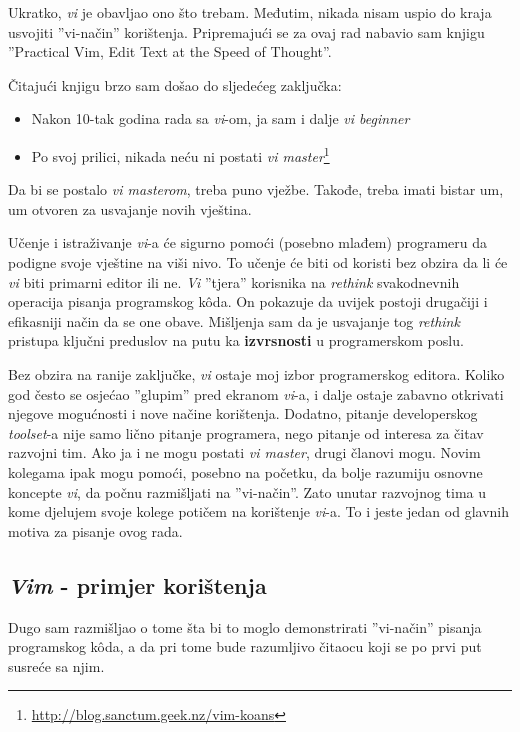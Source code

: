 \documentclass[times, utf8, seminar]{fit}
\begin{document}
Ukratko, \emph{vi} je obavljao ono što trebam. Međutim, nikada nisam uspio do kraja usvojiti ''vi-način'' korištenja. Pripremajući se za ovaj rad nabavio sam knjigu ''Practical Vim, Edit Text at the Speed of Thought''\citep{pragvim}.

Čitajući knjigu brzo sam došao do sljedećeg zaključka:
\begin{itemize}
  \item Nakon 10-tak godina rada sa \emph{vi}-om, ja sam i dalje \emph{vi beginner} 
  \item Po svoj prilici, nikada neću ni postati \emph{vi master}\footnote{\url{http://blog.sanctum.geek.nz/vim-koans}}
\end{itemize}

Da bi se postalo \emph{vi masterom}, treba puno vježbe. Takođe, treba imati bistar um, um otvoren za usvajanje novih vještina. 

Učenje i istraživanje \emph{vi}-a će sigurno pomoći (posebno mlađem) programeru da podigne svoje vještine na viši nivo. To učenje će biti od koristi bez obzira da li će \emph{vi} biti primarni editor ili ne. \emph{Vi} ''tjera'' korisnika na \emph{rethink} svakodnevnih operacija pisanja programskog k\^oda. On pokazuje da uvijek postoji drugačiji i efikasniji način da se one obave. Mišljenja sam da je usvajanje tog \emph{rethink} pristupa ključni preduslov na putu ka \textbf{izvrsnosti} u programerskom poslu.

Bez obzira na ranije zaključke, \emph{vi} ostaje moj izbor programerskog editora.  Koliko god često se osjećao ''glupim'' pred ekranom \emph{vi}-a, i dalje ostaje zabavno otkrivati njegove mogućnosti i nove načine korištenja. Dodatno, pitanje developerskog \emph{toolset}-a nije samo lično pitanje programera, nego pitanje od interesa za čitav razvojni tim. 
Ako ja i ne mogu postati \emph{vi master}, drugi članovi mogu. Novim kolegama ipak mogu pomoći, posebno na početku, da bolje razumiju osnovne koncepte \emph{vi}, da počnu razmišljati na ''vi-način''. Zato unutar razvojnog tima u kome djelujem svoje kolege potičem na korištenje \emph{vi}-a. To i jeste jedan od glavnih motiva za pisanje ovog rada.

\subsection{\emph{Vim} - primjer korištenja}

Dugo sam razmišljao o tome šta bi to moglo demonstrirati ''vi-način'' pisanja programskog k\^oda, a da pri tome bude razumljivo čitaocu koji se po prvi put susreće sa njim.
\end{document}
